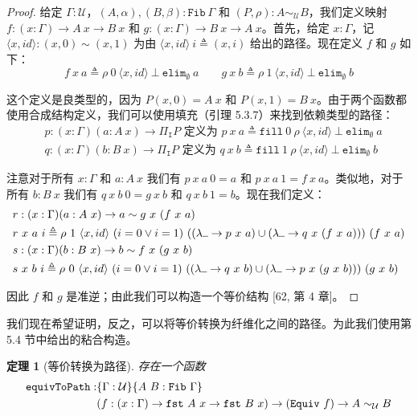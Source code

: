 \documentclass{ctexrep}
\theoremstyle{plain}
\newtheorem{theorem}{定理}[section]
\theoremstyle{definition}
\theoremstyle{remark}
\newcommand\ttI{\mathtt{I}}
\newcommand{\ul}{{\rule[0ex]{0.5em}{0.4pt}}} %
\begin{document}
\begin{proof}
给定 $\Gamma : \mathcal{U}$，$(A, \alpha), (B, \beta) : \mathtt{Fib}\ \Gamma$ 和 $(P, \rho) : A \sim_{\mathcal{U}} B$，我们定义映射 $f : (x : \Gamma) \to A\ x \to B\ x$ 和 $g : (x : \Gamma) \to B\ x \to A\ x$。首先，给定 $x : \Gamma$，记 $\langle x,  id \rangle : (x, 0) \sim (x, 1)$ 为由 $\langle x,  id \rangle\ i \triangleq (x, i)$ 给出的路径。现在定义 $f$ 和 $g$ 如下：
\[
f\ x\ a \triangleq \rho\ 0\ \langle x,  id \rangle\ \bot\ \mathtt{elim}_{\emptyset}\ a \qquad g\ x\ b \triangleq \rho\ 1\ \langle x,  id \rangle\ \bot\ \mathtt{elim}_{\emptyset}\ b
\]

这个定义是良类型的，因为 $P(x, 0) = A\ x$ 和 $P(x, 1) = B\ x$。由于两个函数都使用合成结构定义，我们可以使用填充（引理 5.3.7）来找到依赖类型的路径：
\begin{align*}
&p : (x : \Gamma)(a : A\ x) \to \Pi_{\ttI}P \text{ 定义为 } p\ x\ a \triangleq \mathtt{fill}\ 0\ \rho\ \langle x,  id \rangle\ \bot\ \mathtt{elim}_{\emptyset}\ a\\
&q : (x : \Gamma)(b : B\ x) \to \Pi_{\ttI}P \text{ 定义为 } q\ x\ b \triangleq \mathtt{fill}\ 1\ \rho\ \langle x,  id \rangle\ \bot\ \mathtt{elim}_{\emptyset}\ b
\end{align*}

注意对于所有 $x : \Gamma$ 和 $a : A\ x$ 我们有 $p\ x\ a\ 0 = a$ 和 $p\ x\ a\ 1 = f\ x\ a$。类似地，对于所有 $b : B\ x$ 我们有 $q\ x\ b\ 0 = g\ x\ b$ 和 $q\ x\ b\ 1 = b$。现在我们定义：
\begin{align*}
&r : (x : \Gamma)(a : A\ x) \to a \sim g\ x\ (f\ x\ a)\\
&r\ x\ a\ i \triangleq \rho\ 1\ \langle x,  id \rangle\ (i = 0 \lor i = 1)\ ((\lambda\ul  \to p\ x\ a) \cup (\lambda\ul  \to q\ x\ (f\ x\ a)))\ (f\ x\ a)\\
&s : (x : \Gamma)(b : B\ x) \to b \sim f\ x\ (g\ x\ b)\\
&s\ x\ b\ i \triangleq \rho\ 0\ \langle x,  id \rangle\ (i = 0 \lor i = 1)\ ((\lambda\ul  \to q\ x\ b) \cup (\lambda\ul  \to p\ x\ (g\ x\ b)))\ (g\ x\ b)
\end{align*}

因此 $f$ 和 $g$ 是准逆；由此我们可以构造一个等价结构 [62, 第 4 章]。
\end{proof}

我们现在希望证明，反之，可以将等价转换为纤维化之间的路径。为此我们使用第 5.4 节中给出的粘合构造。

\begin{theorem}[等价转换为路径]
存在一个函数
\begin{align}
\mathtt{equivToPath} : &\{\Gamma : \mathcal{U}\}\{A\ B : \mathtt{Fib}\ \Gamma\} \\
&(f : (x : \Gamma) \to \mathtt{fst}\ A\ x \to \mathtt{fst}\ B\ x) \to (\mathtt{Equiv}\ f) \to A \sim_{\mathcal{U}} B \notag
\end{align}
\end{theorem}
\end{document}

